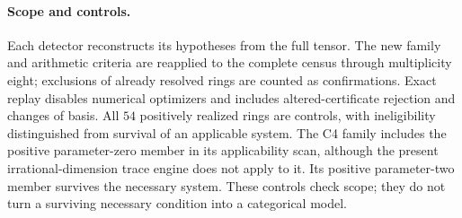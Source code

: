 \paragraph{Scope and controls.}
Each detector reconstructs its hypotheses from the full tensor.
The new family and arithmetic criteria are reapplied to the complete
census through multiplicity eight; exclusions of already resolved
rings are counted as confirmations. Exact replay disables numerical
optimizers and includes altered-certificate rejection and changes
of basis. All $54$ positively realized rings are controls, with
ineligibility distinguished from survival of an applicable system.
The C4 family includes the positive parameter-zero member in its
applicability scan, although the present irrational-dimension trace
engine does not apply to it. Its positive parameter-two member
survives the necessary system. These controls check scope; they do
not turn a surviving necessary condition into a categorical model.
